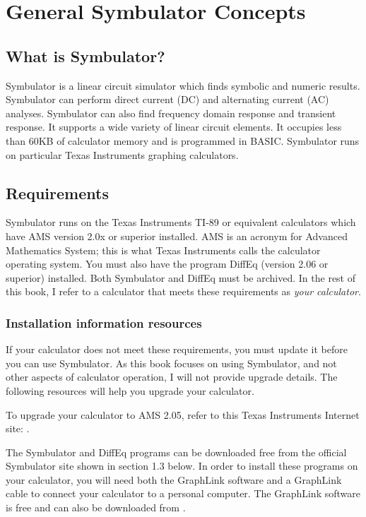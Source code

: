 
\chapter{General Symbulator Concepts}

\section{What is Symbulator?}

Symbulator is a linear circuit simulator which finds symbolic and
numeric results. Symbulator can perform direct current (DC) and
alternating current (AC) analyses. Symbulator can also find
frequency domain response and transient response. It supports a wide
variety of linear circuit elements. It occupies less than 60KB of
calculator memory and is programmed in BASIC. Symbulator runs on
particular Texas Instruments graphing calculators.

\section{Requirements}

Symbulator runs on the Texas Instruments TI-89 or equivalent
calculators which have AMS version 2.0x or superior installed. AMS
is an acronym for Advanced Mathematics System; this is what Texas
Instruments calls the calculator operating system. You must also
have the program DiffEq (version 2.06 or superior) installed. Both
Symbulator and DiffEq must be archived. In the rest of this book, I
refer to a calculator that meets these requirements as \emph{your
calculator}.

\subsection{Installation information resources}

If your calculator does not meet these requirements, you must update
it before you can use Symbulator. As this book focuses on using
Symbulator, and not other aspects of calculator operation, I will
not provide upgrade details. The following resources will help you
upgrade your calculator.

To upgrade your calculator to AMS 2.05, refer to this Texas
Instruments Internet site: .

The Symbulator and DiffEq programs can be downloaded free from the
official Symbulator site shown in section 1.3 below. In order to
install these programs on your calculator, you will need both the
GraphLink software and a GraphLink cable to connect your calculator
to a personal computer. The GraphLink software is free and can also
be downloaded from .

